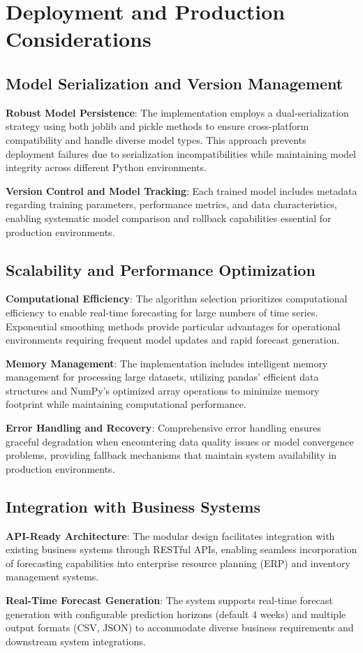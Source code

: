 \section{Deployment and Production Considerations}

\subsection{Model Serialization and Version Management}

\textbf{Robust Model Persistence}: The implementation employs a dual-serialization strategy using both joblib and pickle methods to ensure cross-platform compatibility and handle diverse model types. This approach prevents deployment failures due to serialization incompatibilities while maintaining model integrity across different Python environments.

\textbf{Version Control and Model Tracking}: Each trained model includes metadata regarding training parameters, performance metrics, and data characteristics, enabling systematic model comparison and rollback capabilities essential for production environments.

\subsection{Scalability and Performance Optimization}

\textbf{Computational Efficiency}: The algorithm selection prioritizes computational efficiency to enable real-time forecasting for large numbers of time series. Exponential smoothing methods provide particular advantages for operational environments requiring frequent model updates and rapid forecast generation.

\textbf{Memory Management}: The implementation includes intelligent memory management for processing large datasets, utilizing pandas' efficient data structures and NumPy's optimized array operations to minimize memory footprint while maintaining computational performance.

\textbf{Error Handling and Recovery}: Comprehensive error handling ensures graceful degradation when encountering data quality issues or model convergence problems, providing fallback mechanisms that maintain system availability in production environments.

\subsection{Integration with Business Systems}

\textbf{API-Ready Architecture}: The modular design facilitates integration with existing business systems through RESTful APIs, enabling seamless incorporation of forecasting capabilities into enterprise resource planning (ERP) and inventory management systems.

\textbf{Real-Time Forecast Generation}: The system supports real-time forecast generation with configurable prediction horizons (default 4 weeks) and multiple output formats (CSV, JSON) to accommodate diverse business requirements and downstream system integrations.

